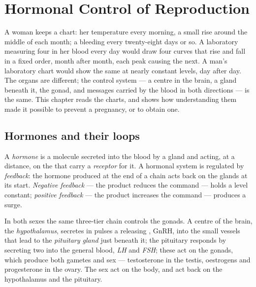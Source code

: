 \chapter{Hormonal Control of Reproduction}\label{ch:g11:hormones-and-reproduction}

A woman keeps a chart: her temperature every morning, a small rise
around the middle of each month; a bleeding every twenty-eight days or
so. A laboratory measuring four  in her blood every day would
draw four curves that rise and fall in a fixed order, month after
month, each peak causing the next. A man's laboratory chart would show
the same  at nearly constant levels, day after day. The organs
are different; the control system --- a centre in the brain, a gland
beneath it, the gonad, and messages carried by the blood in both
directions --- is the same. This chapter reads the charts, and shows
how understanding them made it possible to prevent a pregnancy, or to
obtain one.

\section{Hormones and their loops}

\begin{definition}\label{def:g11:hormones-and-reproduction:hormone}
A \emph{hormone} is a molecule secreted into the blood
by a gland and acting, at a distance, on the  that carry a
\emph{receptor} for it. A hormonal system is regulated by
\emph{feedback}: the hormone produced at the end of a
chain acts back on the glands at its start. \emph{Negative feedback}
--- the product reduces the command --- holds a level constant;
\emph{positive feedback} --- the product increases the command ---
produces a surge.
\end{definition}

\begin{proposition}\label{prop:g11:hormones-and-reproduction:chain}
In both sexes the same three-tier chain controls the gonads. A centre
of the brain, the \emph{hypothalamus}, secretes in pulses a releasing
, GnRH, into the small vessels that lead to the
\emph{pituitary gland} just beneath it; the pituitary responds by
secreting two  into the general blood, \emph{LH} and
\emph{FSH}; these act on the gonads, which produce both gametes and
sex  --- testosterone in the testis, oestrogens and
progesterone in the ovary. The sex  act on the body, and act
back on the hypothalamus and the pituitary.
\end{proposition}
\admitted

